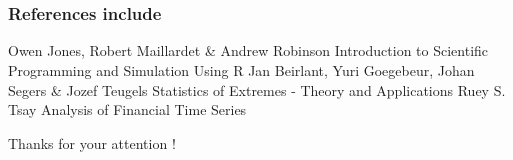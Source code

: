 \documentclass{beamer}
\begin{document}



\section*{}
\begin{frame}
\frametitle{References include}
\footnotesize{
\begin{thebibliography}{99} %
 Owen Jones, Robert Maillardet \& Andrew Robinson
\newblock Introduction to Scientific Programming and Simulation Using R
 Jan Beirlant, Yuri Goegebeur, Johan Segers \& Jozef Teugels
\newblock Statistics of Extremes - Theory and Applications
 Ruey S. Tsay 
\newblock Analysis of Financial Time Series
\end{thebibliography}
}
\end{frame}


\begin{frame}
\Huge{\centerline{Thanks for your attention ! }}
\end{frame}

\end{document}
